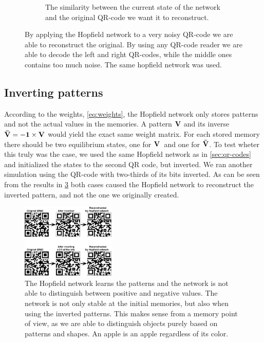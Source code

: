 \begin{figure}[H]
\begin{subfigure}{0.49\textwidth}
        \caption{The similarity between the current state of the network and the original QR-code we want it to reconstruct.}
        \label{fig:qr-codes-stability}
    \end{subfigure}
    \caption{By applying the Hopfield network to a very noisy QR-code we are able to reconstruct the original. By using any QR-code reader we are able to decode the left and right QR-codes, while the middle ones contains too much noise. The same hopfield network was used.}
\end{figure}

\subsection{Inverting patterns}
According to the weights, \cref{eq:weights}, the Hopfield network only stores patterns and not the actual values in the memories. A pattern $\bf V$ and its inverse $\bf \bar{V} = -1 \times \bf V$ would yield the exact same weight matrix. For each stored memory there should be two equilibrium states, one for $\bf V$ and one for $\bf \bar{V}$. To test wheter this truly was the case, we used the same Hopfield network as in \cref{sec:qr-codes} and initialized the states to the second QR code, but inverted. We ran another simulation using the QR-code with two-thirds of its bits inverted. As can be seen from the results in \cref{fig:inverted-qr} both cases caused the Hopfield network to reconstruct the inverted pattern, and not the one we originally created.
\begin{figure}[H]
    \centering
        \includegraphics[width=0.4\textwidth]{figs/qr-inverted}
        \caption{The Hopfield network learns the patterns and the network is not able to distinguish between positive and negative values. The network is not only stable at the initial memories, but also when using the inverted patterns. This makes sense from a memory point of view, as we are able to distinguish objects purely based on patterns and shapes. An apple is an apple regardless of its color.}
        \label{fig:inverted-qr}
\end{figure}